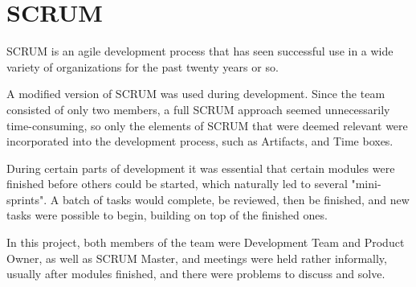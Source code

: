   \section{SCRUM}
  SCRUM is an agile development process that has seen successful use in a wide variety of organizations for the past twenty years or so.
  
  A modified version of SCRUM was used during development. Since the team consisted of only two members, a full SCRUM approach seemed unnecessarily time-consuming, so only the elements of SCRUM that were deemed relevant were incorporated into the development process, such as Artifacts, and Time boxes. 
  
  During certain parts of development it was essential that certain modules were finished before others could be started, which naturally led to several "mini-sprints". A batch of tasks would complete, be reviewed, then be finished, and new tasks were possible to begin, building on top of the finished ones.
  
  In this project, both members of the team were Development Team and Product Owner, as well as SCRUM Master, and meetings were held rather informally, usually after modules finished, and there were problems to discuss and solve. 
